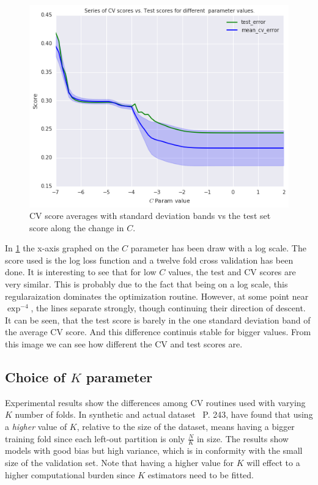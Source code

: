 \begin{figure}[h!]
\begin{center}
\includegraphics[width=0.7\columnwidth]{figures/cross_validation/train_and_cv_score_comparison_logreg.jpg}
\caption{ CV score averages with standard deviation bands vs the test set score along the change in $C$.}
\label{fig:cv_vs_test_score}
\end{center}
\end{figure}

In \cref{fig:cv_vs_test_score} the x-axis graphed on the $C$ parameter has been draw with a log scale.
The score used is the log loss function and a twelve fold cross validation has been done.
It is interesting to see that for low $C$ values, the test and CV scores are very similar. This is probably due to the fact that being on a log scale, this regularaization dominates the optimization routine.
However, at some point near $\exp^{-4}$, the lines separate strongly, though continuing their direction of descent.
It can be seen, that the test score is barely in the one standard deviation band of the average CV score. And this difference continuis stable for bigger values.
From this image we can see how different the CV and test scores are.

\subsection{Choice of \texorpdfstring{$K$ parameter}{Lg} }

 Experimental results show the differences among CV routines used with varying $K$ number of folds. In synthetic and actual dataset~\textcite{hastie-elemstatslearn} P. 243, have found that using a \textit{higher} value of $K$, relative to the size of the dataset, means having a bigger training fold since each left-out partition is only $\frac{N}{K}$ in size. The results show models with good bias but high variance, which is in conformity with the small size of the validation set. Note that having a higher value for $K$ will effect to a higher computational burden since $K$ estimators need to be fitted.

